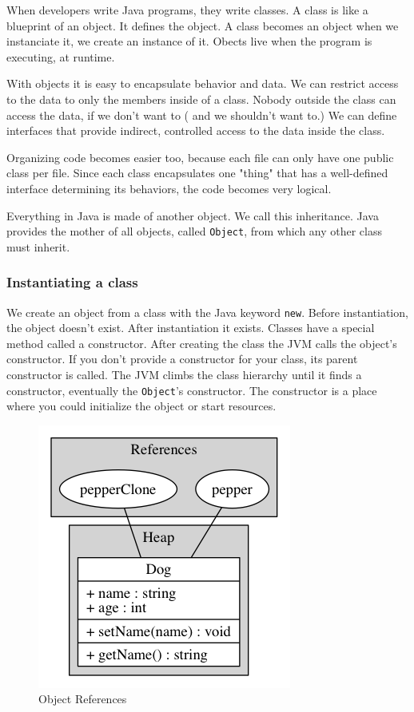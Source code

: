 When developers write Java programs, they write classes. A class is like a blueprint of an object. It defines the object. A class becomes an object when we instanciate it, we create an instance of it. Obects live when the program is executing, at runtime.

With objects it is easy to encapsulate behavior and data. We can restrict access to the data to only the members inside of a class. Nobody outside the class can access the data, if we don't want to ( and we shouldn't want to.) We can define interfaces that provide indirect, controlled access to the data inside the class.

Organizing code becomes easier too, because each file can only have one  public class per file. Since each class encapsulates one "thing" that has a well-defined interface determining its behaviors, the code becomes very logical.

Everything in Java is made of another object. We call this inheritance. Java provides the mother of all objects, called \texttt{Object}, from which any other class must inherit.

\subsubsection{Instantiating a class}
We create an object from a class with the Java keyword \texttt{new}. Before instantiation, the object doesn't exist. After instantiation it exists. Classes have a special method called a constructor. After creating the class the JVM calls the object's constructor. If you don't provide a constructor for your class, its parent constructor is called. The JVM climbs the class hierarchy until it finds  a constructor, eventually the \texttt{Object}'s constructor. The constructor is a place where you could initialize the object or start resources.\cite{nicholas}
\begin{figure}[H]\centering %
\includegraphics[width=0.5\linewidth]{object-reference}
\caption{Object References}
\label{fig:object-references}
\end{figure}
